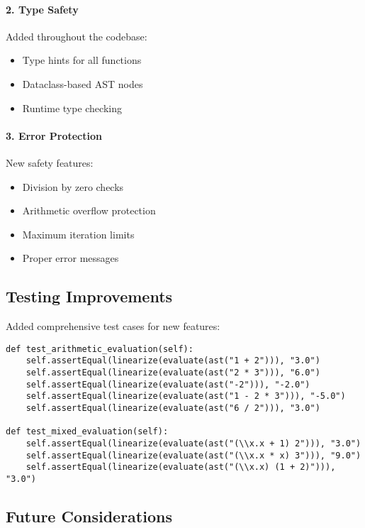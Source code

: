 \paragraph{2. Type Safety}
Added throughout the codebase:
\begin{itemize}
    \item Type hints for all functions
    \item Dataclass-based AST nodes
    \item Runtime type checking
\end{itemize}

\paragraph{3. Error Protection}
New safety features:
\begin{itemize}
    \item Division by zero checks
    \item Arithmetic overflow protection
    \item Maximum iteration limits
    \item Proper error messages
\end{itemize}

\subsection{Testing Improvements}

Added comprehensive test cases for new features:

\begin{verbatim}
def test_arithmetic_evaluation(self):
    self.assertEqual(linearize(evaluate(ast("1 + 2"))), "3.0")
    self.assertEqual(linearize(evaluate(ast("2 * 3"))), "6.0")
    self.assertEqual(linearize(evaluate(ast("-2"))), "-2.0")
    self.assertEqual(linearize(evaluate(ast("1 - 2 * 3"))), "-5.0")
    self.assertEqual(linearize(evaluate(ast("6 / 2"))), "3.0")

def test_mixed_evaluation(self):
    self.assertEqual(linearize(evaluate(ast("(\\x.x + 1) 2"))), "3.0")
    self.assertEqual(linearize(evaluate(ast("(\\x.x * x) 3"))), "9.0")
    self.assertEqual(linearize(evaluate(ast("(\\x.x) (1 + 2)"))), "3.0")
\end{verbatim}

\subsection{Future Considerations}

